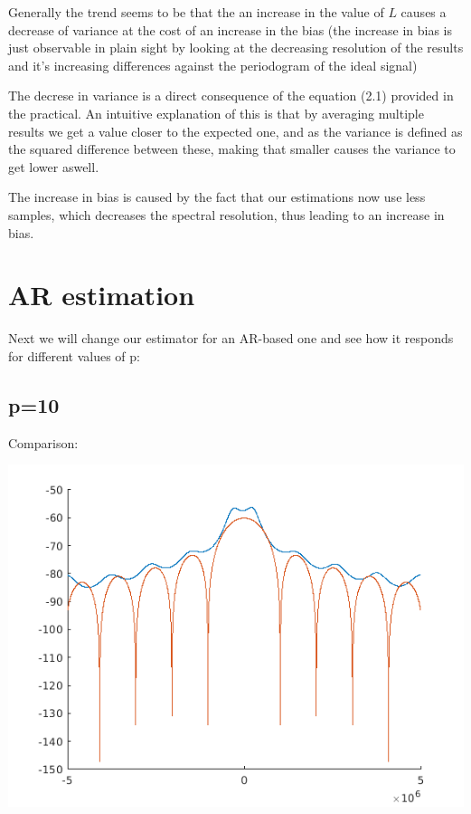 \documentclass[conference,9pt]{IEEEtran}
\begin{document}
Generally the trend seems to be that the an increase in the value of $L$ causes a decrease of variance at the cost of an increase in the bias (the increase in bias is just observable in plain sight by looking at the decreasing resolution of the results and it's increasing differences against the periodogram of the ideal signal)


The decrese in variance is a direct consequence of the equation (2.1) provided in the practical. An intuitive explanation of this is that by averaging multiple results we get a value closer to the expected one, and as the variance is defined as the squared difference between these, making that smaller causes the variance to get lower aswell.

The increase in bias is caused by the fact that our estimations now use less samples, which decreases the spectral resolution, thus leading to an increase in bias.

\section{AR estimation}
Next we will change our estimator for an AR-based one and see how it responds for different values of p:

\subsection{p=10}
Comparison:

\includegraphics[scale=0.6]{arp10.png}
\end{document}
